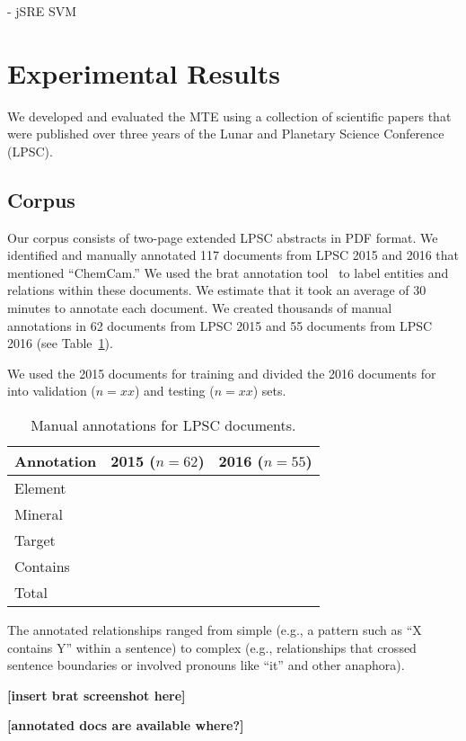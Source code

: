 \documentclass[letterpaper]{article} %
\begin{document}
- jSRE SVM

\section{Experimental Results}

We developed and evaluated the MTE using a collection of scientific
papers that were published over three years of the Lunar and Planetary
Science Conference (LPSC).

\subsection{Corpus}

Our corpus consists of two-page extended LPSC abstracts in PDF format.
We identified and manually annotated 117 documents from LPSC 2015 and
2016 that mentioned ``ChemCam.''  We used the brat annotation
tool~\cite{brat} to label entities and relations within these
documents.  We estimate that it took an average of 30 minutes to
annotate each document.  We created thousands of manual annotations in
62 documents from LPSC 2015 and 55 documents from LPSC 2016 (see
Table~\ref{tab:docs}).

We used the 2015 documents for training and divided the 2016 documents
for into validation ($n=xx$) and testing ($n=xx$) sets.

\begin{table}
\caption{Manual annotations for LPSC documents.}
\label{tab:docs}
\begin{center}
\begin{tabular}{l|ll}
Annotation & 2015 ($n=62$) & 2016 ($n=55$) \\ \hline
Element  & \\
Mineral  & \\
Target   & \\ \hline
Contains & \\ \hline
Total & \\
\hline
\end{tabular}
\end{center}
\end{table}

The annotated relationships ranged from simple (e.g., a pattern such
as ``X contains Y'' within a sentence) to complex (e.g., relationships
that crossed sentence boundaries or involved pronouns like ``it'' and
other anaphora).

{\bf [insert brat screenshot here]}

{\bf [annotated docs are available where?]}
\end{document}
